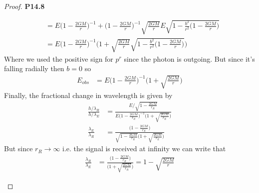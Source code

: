 \documentclass[11pt]{article}
\theoremstyle{definition}
\begin{document}
\begin{proof}{\textbf{P14.8}}
\begin{itemize}
\begin{align*}
    &= E\bigg(1 - \frac{2GM}{r}\bigg)^{-1}
    + \bigg(1 - \frac{2GM}{r}\bigg)^{-1}\sqrt{\frac{2GM}{r}}
    E\sqrt{1 - \frac{b^2}{r^2}\bigg(1 - \frac{2GM}{r}\bigg)}\\
    &= E\bigg(1 - \frac{2GM}{r}\bigg)^{-1}
    \bigg(1 + \sqrt{\frac{2GM}{r}}
    \sqrt{1 - \frac{b^2}{r^2}\bigg(1 - \frac{2GM}{r}\bigg)}\bigg)
\end{align*}
Where we used the positive sign for $p^r$ since the photon is outgoing.
But since it's falling radially then $b = 0$ so
\begin{align*}
    E_{obs} &= E\bigg(1 - \frac{2GM}{r}\bigg)^{-1}
    \bigg(1 + \sqrt{\frac{2GM}{r}}\bigg)
\end{align*}
Finally, the fractional change in wavelength is given by
\begin{align*}
    \frac{h/\lambda_R}{h/\lambda_E}
    &= \frac{E/\sqrt{1 - \frac{2GM}{r_R}}}{E\bigg(1 - \frac{2GM}{r_E}\bigg)^{-1}
    \bigg(1 + \sqrt{\frac{2GM}{r_E}}\bigg)}\\
    \frac{\lambda_E}{\lambda_R}
    &= \frac{\bigg(1 - \frac{2GM}{r_E}\bigg)}
    {\sqrt{1 - \frac{2GM}{r_R}}\bigg(1 + \sqrt{\frac{2GM}{r_E}}\bigg)}
\end{align*}
But since $r_R \to \infty$ i.e. the signal is received at infinity
we can write that
\begin{align*}
    \frac{\lambda_R}{\lambda_E} &= \frac{\bigg(1 - \frac{2GM}{r_R}\bigg)}
    {\bigg(1 + \sqrt{\frac{2GM}{r_R}}\bigg)}
    = 1 - \sqrt{\frac{2GM}{r}}
\end{align*}
\end{itemize}
\end{proof}
\end{document}
